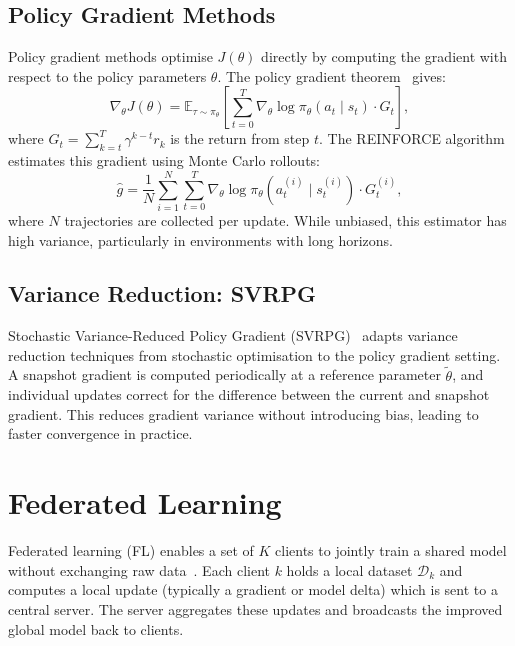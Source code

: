 \documentclass[a4paper, oneside]{discothesis}
\begin{document}
\subsection{Policy Gradient Methods}

Policy gradient methods optimise $J(\theta)$ directly by computing the gradient with respect to the policy parameters $\theta$. The policy gradient theorem~\cite{SuttonBarto} gives:
\begin{equation}
    \nabla_\theta J(\theta) = \mathbb{E}_{\tau \sim \pi_\theta} \left[ \sum_{t=0}^{T} \nabla_\theta \log \pi_\theta(a_t \mid s_t) \cdot G_t \right],
\end{equation}
where $G_t = \sum_{k=t}^{T} \gamma^{k-t} r_k$ is the return from step $t$. The REINFORCE algorithm~\cite{REINFORCE} estimates this gradient using Monte Carlo rollouts:
\begin{equation}
    \hat{g} = \frac{1}{N} \sum_{i=1}^{N} \sum_{t=0}^{T} \nabla_\theta \log \pi_\theta(a_t^{(i)} \mid s_t^{(i)}) \cdot G_t^{(i)},
\end{equation}
where $N$ trajectories are collected per update. While unbiased, this estimator has high variance, particularly in environments with long horizons.

\subsection{Variance Reduction: SVRPG}

Stochastic Variance-Reduced Policy Gradient (SVRPG)~\cite{SVRPG} adapts variance reduction techniques from stochastic optimisation to the policy gradient setting. A snapshot gradient is computed periodically at a reference parameter $\tilde{\theta}$, and individual updates correct for the difference between the current and snapshot gradient. This reduces gradient variance without introducing bias, leading to faster convergence in practice.

\section{Federated Learning}
\label{sec:fl}

Federated learning (FL) enables a set of $K$ clients to jointly train a shared model without exchanging raw data~\cite{FLsurvey}. Each client $k$ holds a local dataset $\mathcal{D}_k$ and computes a local update (typically a gradient or model delta) which is sent to a central server. The server aggregates these updates and broadcasts the improved global model back to clients.
\end{document}
